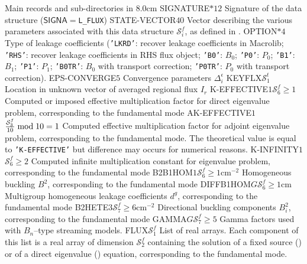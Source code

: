 \begin{DescriptionEnregistrement}{Main records and sub-directories in }{8.0cm}
\CharEnr
  {SIGNATURE}{$*12$}
  {Signature of the data structure ($\mathsf{SIGNA}=${\tt L\_FLUX})}
\IntEnr
  {STATE-VECTOR}{$40$}
  {Vector describing the various parameters associated with this data structure $\mathcal{S}^{f}_{i}$,
  as defined in .}
\CharEnr
  {OPTION}{$*4$}
  {Type of leakage coefficients ({\tt 'LKRD'}: recover leakage coefficients in Macrolib; {\tt 'RHS'}: recover
  leakage coefficients in RHS flux object; {\tt 'B0'}: $B_0$; {\tt 'P0'}: $P_0$; {\tt 'B1'}: $B_1$; {\tt 'P1'}:
   $P_1$; {\tt 'B0TR'}: $B_0$ with transport correction; {\tt 'P0TR'}: $P_0$ with transport correction).}
\RealEnr
  {EPS-CONVERGE}{$5$}{}
  {Convergence parameters $\Delta_i^\epsilon$}
\IntEnr
  {KEYFLX}{$\mathcal{S}^{t}_{1}$}
  {Location in unknown vector of averaged regional flux $I_{r}$}
\OptRealEnr
  {K-EFFECTIVE}{$1$}{$\mathcal{S}^{f}_{6}\ge 1$}{}
  {Computed or imposed effective multiplication factor for direct eigenvalue problem,
  corresponding to the fundamental mode}
\OptRealEnr
  {AK-EFFECTIVE}{$1$}{${\mathcal{S}^{f}_{3}\over 10} \bmod 10 = 1$}{}
  {Computed effective multiplication factor for adjoint eigenvalue problem,
  corresponding to the fundamental mode.
  The theoretical value is equal
  to {\tt 'K-EFFECTIVE'} but difference may occurs for numerical reasons.}
\OptRealEnr
  {K-INFINITY}{$1$}{$\mathcal{S}^{f}_{6}\ge 2$}{}
  {Computed infinite multiplication constant for eigenvalue problem,
  corresponding to the fundamental mode}
\OptRealEnr
  {B2B1HOM}{$1$}{$\mathcal{S}^{f}_{6}\ge 1$}{cm$^{-2}$}
  {Homogeneous buckling $B^{2}$,
  corresponding to the fundamental mode}
\OptRealEnr
  {DIFFB1HOM}{$G$}{$\mathcal{S}^{f}_{6}\ge 1$}{cm}
  {Multigroup homogeneous leakage coefficients $d^{g}$,
  corresponding to the fundamental mode}
\OptRealEnr
  {B2HETE}{$3$}{$\mathcal{S}^{f}_{7} \ge 6$}{cm$^{-2}$}
  {Directional buckling components $B^{2}_{i}$,
  corresponding to the fundamental mode}
\OptRealEnr
  {GAMMA}{$G$}{$\mathcal{S}^{f}_{7}\ge 5$}{}
  {Gamma factors used with $B_n$--type streaming models.}
\DirlEnr
  {FLUX}{$\mathcal{S}^{f}_{1}$}
  {List of real arrays. Each component of this list is a real array of dimension $\mathcal{S}^{f}_{2}$
  containing the solution of a fixed source () or of a direct eigenvalue () equation,
  corresponding to the fundamental mode.}
\OptDirlEnr

\end{DescriptionEnregistrement}
